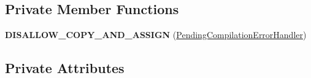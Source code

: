 \subsection*{Private Member Functions}
\begin{DoxyCompactItemize}
\item 
{\bfseries D\+I\+S\+A\+L\+L\+O\+W\+\_\+\+C\+O\+P\+Y\+\_\+\+A\+N\+D\+\_\+\+A\+S\+S\+I\+GN} (\hyperlink{classv8_1_1internal_1_1_pending_compilation_error_handler}{Pending\+Compilation\+Error\+Handler})\hypertarget{classv8_1_1internal_1_1_pending_compilation_error_handler_afd5a7aa4ff79f6c9867375fbbf2ebf5f}{}\label{classv8_1_1internal_1_1_pending_compilation_error_handler_afd5a7aa4ff79f6c9867375fbbf2ebf5f}

\end{DoxyCompactItemize}
\subsection*{Private Attributes}
